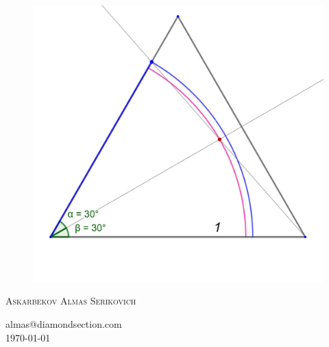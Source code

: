 \documentclass[12pt, letterpaper, oneside]{report}
\begin{document}
\begin{titlepage}
\begin{figure}[h]
\centerline{\includegraphics[scale=0.2]{images/ds_tr.jpg}}

\label{logo}
\end{figure}
\textsc{\LARGE Askarbekov Almas Serikovich }\\[1.5cm]
\begin{center}
	\large {almas@diamondsection.com}\\
	\today
\end{center}
\end{titlepage}
\end{document}
